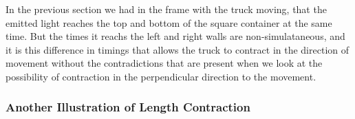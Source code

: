 In the previous section we had in the frame with the truck moving, that the emitted light reaches the top and bottom of the square container at the same time.
But the times it reachs the left and right walls are non-simulataneous, and it is this difference in timings that allows the truck to contract in the direction of movement without the contradictions that are present when we look at the possibility of contraction in the perpendicular direction to the movement.



\subsubsection{Another Illustration of Length Contraction}

